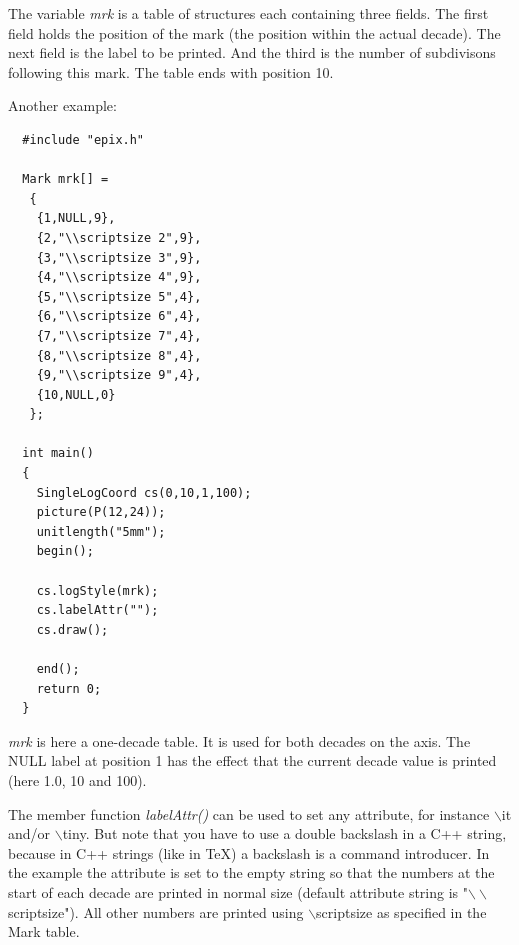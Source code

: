 \documentclass[12pt,a4paper]{article}
\begin{document}
  The variable \textit{mrk} is a table of structures each containing three
  fields. The first field holds the position of the mark (the position within
  the actual decade). The next field is the label to be printed. And the third
  is the number of subdivisons following this mark. The table ends with
  position 10.

  \newpage
  Another example:

  \begin{minipage}{8.0cm}
    \begin{lstlisting}
  #include "epix.h"

  Mark mrk[] =
   {
    {1,NULL,9},
    {2,"\\scriptsize 2",9},
    {3,"\\scriptsize 3",9},
    {4,"\\scriptsize 4",9},
    {5,"\\scriptsize 5",4},
    {6,"\\scriptsize 6",4},
    {7,"\\scriptsize 7",4},
    {8,"\\scriptsize 8",4},
    {9,"\\scriptsize 9",4},
    {10,NULL,0}
   };

  int main()
  {
    SingleLogCoord cs(0,10,1,100);
    picture(P(12,24));
    unitlength("5mm");
    begin();

    cs.logStyle(mrk);
    cs.labelAttr("");
    cs.draw();

    end();
    return 0;
  }
    \end{lstlisting}
  \end{minipage}
  \begin{minipage}{5.5cm}
    
  \end{minipage}

  \textit{mrk} is here a one-decade table. It is used for both decades on the
  axis. The NULL label at position 1 has the effect that the current decade value
  is printed (here 1.0, 10 and 100).

  The member function \textit{labelAttr()} can be used to set any attribute, for
  instance $\backslash$it and/or $\backslash$tiny. But note that you have to use
  a double backslash in a C++ string, because in C++ strings (like in \TeX) a
  backslash is a command introducer. In the example the attribute is set to
  the empty string so that the numbers at the start of each decade are printed
  in normal size (default attribute string is "$\backslash\backslash$scriptsize").
  All other numbers are printed using $\backslash$scriptsize as specified in the
  Mark table.
\end{document}
